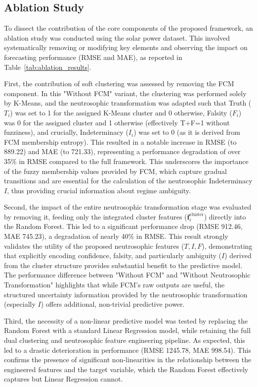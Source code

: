 \documentclass[review,3p,times]{elsarticle}
\begin{document}
\subsection{Ablation Study}
\label{subsec:ablation_study}

To dissect the contribution of the core components of the proposed framework, an ablation study was conducted using the solar power dataset. This involved systematically removing or modifying key elements and observing the impact on forecasting performance (RMSE and MAE), as reported in Table~\ref{tab:ablation_results}.

First, the contribution of soft clustering was assessed by removing the FCM component. In this "Without FCM" variant, the clustering was performed solely by K-Means, and the neutrosophic transformation was adapted such that Truth ($T_i$) was set to 1 for the assigned K-Means cluster and 0 otherwise, Falsity ($F_i$) was 0 for the assigned cluster and 1 otherwise (effectively T+F=1 without fuzziness), and crucially, Indeterminacy ($I_i$) was set to 0 (as it is derived from FCM membership entropy). This resulted in a notable increase in RMSE (to 889.22) and MAE (to 721.33), representing a performance degradation of over 35\% in RMSE compared to the full framework. This underscores the importance of the fuzzy membership values provided by FCM, which capture gradual transitions and are essential for the calculation of the neutrosophic Indeterminacy $I$, thus providing crucial information about regime ambiguity.

Second, the impact of the entire neutrosophic transformation stage was evaluated by removing it, feeding only the integrated cluster features ($\mathbf{f}_i^{\text{cluster}}$) directly into the Random Forest. This led to a significant performance drop (RMSE 912.46, MAE 745.23), a degradation of nearly 40\% in RMSE. This result strongly validates the utility of the proposed neutrosophic features ($T, I, F$), demonstrating that explicitly encoding confidence, falsity, and particularly ambiguity ($I$) derived from the cluster structure provides substantial benefit to the predictive model. The performance difference between "Without FCM" and "Without Neutrosophic Transformation" highlights that while FCM's raw outputs are useful, the structured uncertainty information provided by the neutrosophic transformation (especially $I$) offers additional, non-trivial predictive power.

Third, the necessity of a non-linear predictive model was tested by replacing the Random Forest with a standard Linear Regression model, while retaining the full dual clustering and neutrosophic feature engineering pipeline. As expected, this led to a drastic deterioration in performance (RMSE 1245.78, MAE 998.54). This confirms the presence of significant non-linearities in the relationship between the engineered features and the target variable, which the Random Forest effectively captures but Linear Regression cannot.
\end{document}

